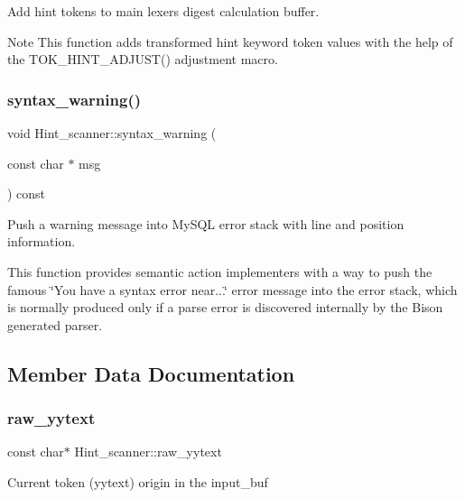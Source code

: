 Add hint tokens to main lexer\textquotesingle{}s digest calculation buffer.

\begin{DoxyNote}{Note}
This function adds transformed hint keyword token values with the help of the T\+O\+K\+\_\+\+H\+I\+N\+T\+\_\+\+A\+D\+J\+U\+S\+T() adjustment macro. 
\end{DoxyNote}
\mbox{\label{classHint__scanner_adb3502bdcfb4f709c6fd089bdb171590}} 
\subsubsection{\texorpdfstring{syntax\+\_\+warning()}{syntax\_warning()}}
{\footnotesize\ttfamily void Hint\+\_\+scanner\+::syntax\+\_\+warning (\begin{DoxyParamCaption}\item[{const char $\ast$}]{msg }\end{DoxyParamCaption}) const}



Push a warning message into My\+S\+QL error stack with line and position information. 

This function provides semantic action implementers with a way to push the famous \char`\"{}\+You have a syntax error near...\char`\"{} error message into the error stack, which is normally produced only if a parse error is discovered internally by the Bison generated parser. 

\subsection{Member Data Documentation}
\mbox{\label{classHint__scanner_a20ecccc8d99baaf45ce8b40e436b2c46}} 
\subsubsection{\texorpdfstring{raw\+\_\+yytext}{raw\_yytext}}
{\footnotesize\ttfamily const char$\ast$ Hint\+\_\+scanner\+::raw\+\_\+yytext}

Current token (yytext) origin in the input\+\_\+buf \mbox{\label{classHint__scanner_a621416d10cdbca82e6f5a7d67b2795dd}} 
